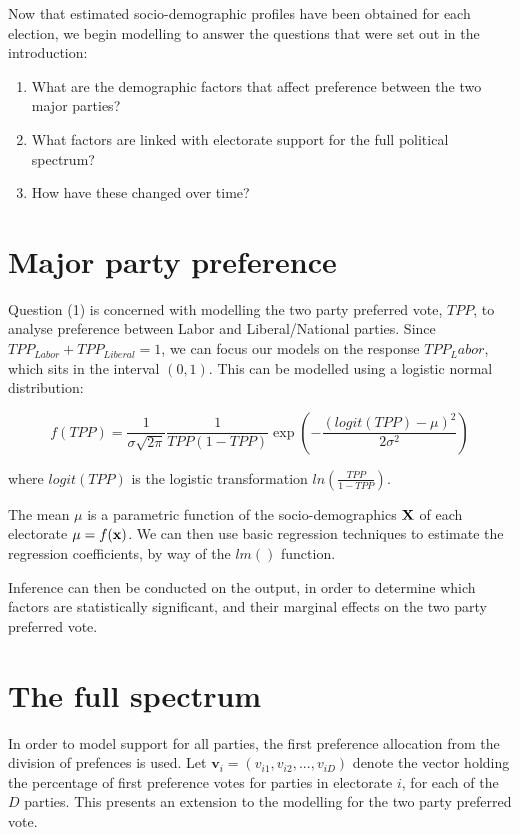 \documentclass{monashthesis}
\theoremstyle{definition}
\theoremstyle{definition}
\theoremstyle{definition}
\theoremstyle{remark}
\begin{document}
Now that estimated socio-demographic profiles have been obtained for
each election, we begin modelling to answer the questions that were set
out in the introduction:

\begin{enumerate}
\def\labelenumi{\arabic{enumi}.}
\item
  What are the demographic factors that affect preference between the
  two major parties?
\item
  What factors are linked with electorate support for the full political
  spectrum?
\item
  How have these changed over time?
\end{enumerate}

\section{Major party preference}\label{major-party-preference}

Question (1) is concerned with modelling the two party preferred vote,
\(TPP\), to analyse preference between Labor and Liberal/National
parties. Since \(TPP_{Labor} + TPP_{Liberal} = 1\), we can focus our
models on the response \(TPP_Labor\), which sits in the interval
\((0,1)\). This can be modelled using a logistic normal distribution:

\[f(TPP) = \frac{1}{\sigma \sqrt{2 \pi}} \frac{1}{TPP(1-TPP)}\exp(-\frac{(logit(TPP)-\mu)^2}{2\sigma^2})\]

where \(logit(TPP)\) is the logistic transformation
\(ln(\frac{TPP}{1-TPP})\).

The mean \(\mu\) is a parametric function of the socio-demographics
\(\bf X\) of each electorate \(\mu = f({\bf x})\). We can then use basic
regression techniques to estimate the regression coefficients, by way of
the \(lm()\) function.

Inference can then be conducted on the output, in order to determine
which factors are statistically significant, and their marginal effects
on the two party preferred vote.

\section{The full spectrum}\label{the-full-spectrum}

In order to model support for all parties, the first preference
allocation from the division of prefences is used. Let
\(\textbf{v}_i = (v_{i1}, v_{i2}, ..., v_{iD})\) denote the vector
holding the percentage of first preference votes for parties in
electorate \(i\), for each of the \(D\) parties. This presents an
extension to the modelling for the two party preferred vote.
\end{document}
